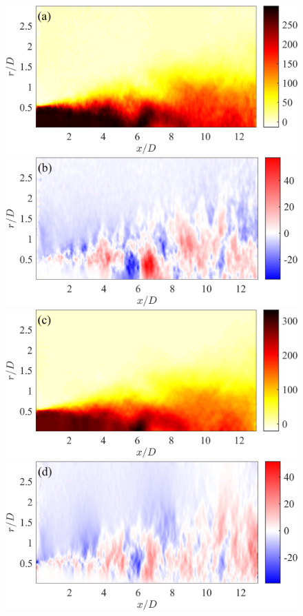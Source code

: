 \begin{figure}
	\centering
		\includegraphics[width=0.45\linewidth]{Figures/ch5_valid_Inst_Uz_v2.png} %
		\includegraphics[width=0.45\linewidth]{Figures/ch5_valid_Inst_Ur_v2.png}\\
		\includegraphics[width=0.45\linewidth]{Figures/ch5_valid_Inst_solUz_v2.png}
		\includegraphics[width=0.45\linewidth]{Figures/ch5_valid_Inst_solUr_v2.png}\\

\end{figure}
